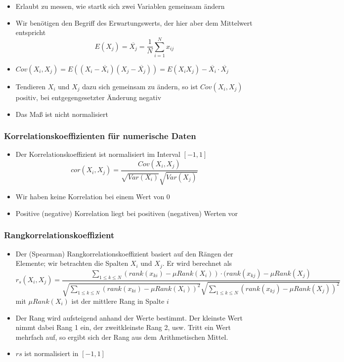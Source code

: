 \documentclass{scrartcl}
\begin{document}
\begin{itemize}
	\item Erlaubt zu messen, wie startk sich zwei Variablen gemeinsam ändern
	\item Wir benötigen den Begriff des Erwartungswerts, der hier aber dem 
	Mittelwert entspricht
	\[ E(X_j) = \overline{X_j} = \frac{1}{N} \sum_{i=1}^{N} x_{ij} \]
	\item $ Cov(X_i,X_j) = E((X_i - \overline{X_i})(X_j - \overline{X_j})) = 
	E(X_iX_j) - \overline{X_i} \cdot \overline{X_j} $
	\item Tendieren $ X_i $ und $ X_j $ dazu sich gemeinsam zu ändern, so ist $ 
	Cov(X_i,X_j) $ positiv, bei entgegengesetzter Änderung negativ
	\item Das Maß ist nicht normalisiert
\end{itemize}

\subsubsection{Korrelationskoeffizienten für numerische Daten}

\begin{itemize}
	\item Der Korrelationskoeffizient ist normalisiert im Interval $ [-1,1] $
	\[ cor(X_i,X_j) = \frac{Cov(X_i,X_j)}{\sqrt{Var(X_i)} \sqrt{Var(X_j)}} \]
	\item Wir haben keine Korrelation bei einem Wert von 0
	\item Positive (negative) Korrelation liegt bei positiven (negativen) 
	Werten vor
\end{itemize}

\subsubsection{Rangkorrelationskoeffizient}

\begin{itemize}
	\item Der (Spearman) Rangkorrelationskoeffizient basiert auf den Rängen der 
	Elemente; wir betrachten die Spalten $ X_i $ und $ X_j $. Er wird berechnet 
	als
	\[ r_s(X_i,X_j) = \frac{\sum_{1 \leq k \leq N} (rank(x_{ki}) - 
	\mu Rank(X_i)) \cdot (rank(x_{kj}) - \mu Rank(X_j)}{\sqrt{\sum_{1 \leq k 
	\leq N} (rank(x_{ki}) - \mu Rank(X_i))^2} \sqrt{\sum_{1 \leq k \leq N} 
(rank(x_{kj}) - \mu Rank(X_j))^2}} \]
	mit $ \mu Rank(X_i) $ ist der mittlere Rang in Spalte $ i $
	\item Der Rang wird aufsteigend anhand der Werte bestimmt. Der kleinste 
	Wert nimmt dabei Rang 1 ein, der zweitkleinste Rang 2, usw. Tritt ein Wert 
	mehrfach auf, so ergibt sich der Rang aus dem Arithmetischen Mittel.
	\item $ rs $ ist normalisiert in $ [-1,1] $
\end{itemize}
\end{document}
